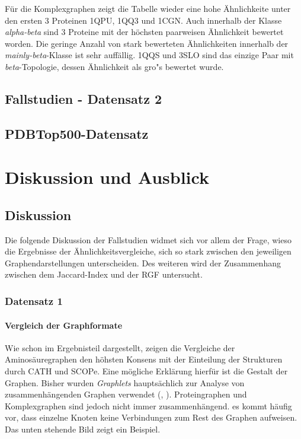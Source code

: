 \documentclass{report}
\begin{document}
F\"ur die Komplexgraphen zeigt die Tabelle wieder eine hohe \"Ahnlichkeite unter den ersten 3 Proteinen 1QPU, 1QQ3 und 1CGN. Auch innerhalb der Klasse \textit{alpha-beta} sind 3 Proteine mit der h\"ochsten paarweisen \"Ahnlichkeit bewertet worden. Die geringe Anzahl von stark bewerteten \"Ahnlichkeiten innerhalb der \textit{mainly-beta}-Klasse ist sehr auff\"allig. 1QQS und 3SLO sind das einzige Paar mit \textit{beta}-Topologie, dessen \"Ahnlichkeit als gro"s bewertet wurde.

\section{Fallstudien - Datensatz 2}

\section{PDBTop500-Datensatz}


\chapter{Diskussion und Ausblick}



\section{Diskussion}

Die folgende Diskussion der Fallstudien widmet sich vor allem der Frage, wieso die Ergebnisse der \"Ahnlichkeitsvergleiche, sich so stark zwischen den jeweiligen Graphendarstellungen unterscheiden.
Des weiteren wird der Zusammenhang zwischen dem Jaccard-Index und der RGF untersucht.

\subsection{Datensatz 1}
\subsubsection{Vergleich der Graphformate}

Wie schon im Ergebnisteil dargestellt, zeigen die Vergleiche der Aminos\"auregraphen den h\"ohsten Konsens mit der Einteilung der Strukturen durch CATH und SCOPe. Eine m\"ogliche Erkl\"arung hierf\"ur ist die Gestalt der Graphen. Bisher wurden \textit{Graphlets} haupts\"achlich zur Analyse von zusammenh\"angenden Graphen verwendet (\cite{sherv_graphlets}, \cite{graphletfrequency}).
Proteingraphen und Komplexgraphen sind jedoch nicht immer zusammenh\"angend. es kommt h\"aufig vor, dass einzelne Knoten keine Verbindungen zum Rest des Graphen aufweisen. Das unten stehende Bild zeigt ein Beispiel.
\end{document}

